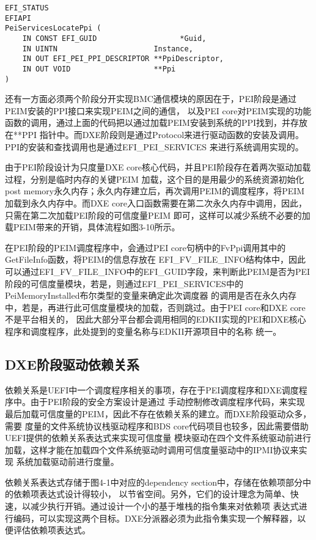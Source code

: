 \begin{lstlisting}
EFI_STATUS
EFIAPI
PeiServicesLocatePpi (
    IN CONST EFI_GUID                   *Guid,
    IN UINTN                      Instance,
    IN OUT EFI_PEI_PPI_DESCRIPTOR **PpiDescriptor,
    IN OUT VOID                   **Ppi
)
\end{lstlisting}
还有一方面必须两个阶段分开实现BMC通信模块的原因在于，PEI阶段是通过PEIM安装的PPI接口来实现PEIM之间的通信，
以及PEI core对PEIM实现的功能函数的调用，通过上面的代码把以通过加载PEIM安装到系统的PPI找到，并存放在**PPI
指针中。而DXE阶段则是通过Protocol来进行驱动函数的安装及调用。PPI的安装和查找调用也是通过EFI\_PEI\_SERVICES
来进行系统调用实现的。
\par 由于PEI阶段设计为只度量DXE core核心代码，并且PEI阶段存在着两次驱动加载过程，分别是临时内存的关键PEIM
加载，这个目的是用最少的系统资源初始化post memory永久内存；永久内存建立后，再次调用PEIM的调度程序，将PEIM
加载到永久内存中。而DXE core入口函数需要在第二次永久内存中调用，因此，只需在第二次加载PEI阶段的可信度量PEIM
即可，这样可以减少系统不必要的加载PEIM带来的开销，具体流程如图3-10所示。
\par 在PEI阶段的PEIM调度程序中，会通过PEI core句柄中的FvPpi调用其中的GetFileInfo函数，将PEIM的信息存放在
EFI\_FV\_FILE\_INFO结构体中，因此可以通过EFI\_FV\_FILE\_INFO中的EFI\_GUID字段，来判断此PEIM是否为PEI
阶段的可信度量模块，若是，则通过EFI\_PEI\_SERVICES中的PeiMemoryInstalled布尔类型的变量来确定此次调度器
的调用是否在永久内存中，若是，再进行此可信度量模块的加载，否则跳过。由于PEI core和DXE core不是平台相关的，
因此大部分平台都会调用相同的EDKII\cite{extra4}实现的PEI和DXE核心程序和调度程序，此处提到的变量名称与EDKII开源项目中的名称
统一。

\subsection{DXE阶段驱动依赖关系}
依赖关系是UEFI中一个调度程序相关的事项，存在于PEI调度程序和DXE调度程序中。由于PEI阶段的安全方案设计是通过
手动控制修改调度程序代码，来实现最后加载可信度量的PEIM，因此不存在依赖关系的建立。而DXE阶段驱动众多，需要
度量的文件系统协议栈驱动程序和BDS core代码项目也较多，因此需要借助UEFI提供的依赖关系表达式来实现可信度量
模块驱动在四个文件系统驱动前进行加载，这样才能在加载四个文件系统驱动时调用可信度量驱动中的IPMI协议来实现
系统加载驱动前进行度量。
\par 依赖关系表达式存储于图4-1中对应的dependency section中，存储在依赖项部分中的依赖项表达式设计得较小，
以节省空间。另外，它们的设计理念为简单、快速，以减少执行开销。通过设计一个小的基于堆栈的指令集来对依赖项
表达式进行编码，可以实现这两个目标。DXE分派器必须为此指令集实现一个解释器，以便评估依赖项表达式。


